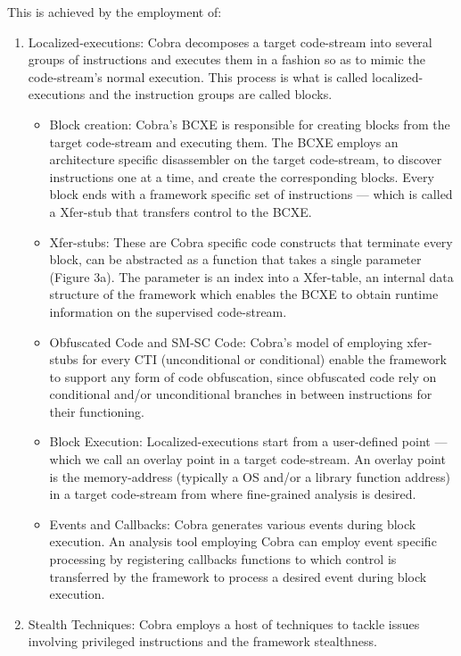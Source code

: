 \documentclass[11pt]{article}
\begin{document}
		This is achieved by the employment of:
		\begin{enumerate}
			\item Localized-executions: Cobra decomposes a target code-stream into several groups of instructions and executes them in a fashion so as to mimic the code-stream’s normal execution. This process is what is called localized-executions and the instruction groups are called blocks.
			\begin{itemize}
				\item Block creation: Cobra’s BCXE is responsible for creating blocks from the target code-stream and executing them. The BCXE employs an architecture specific disassembler on the target code-stream, to discover instructions one at a time, and create the corresponding blocks. Every block ends with a framework specific set of instructions — which is called a Xfer-stub that transfers control to the BCXE.
				\item Xfer-stubs: These are Cobra specific code constructs that terminate every block, can be abstracted as a function that takes a single parameter (Figure 3a). The parameter is an index into a Xfer-table, an internal data structure of the framework which enables the BCXE to obtain runtime information on the supervised code-stream.
				\item Obfuscated Code and SM-SC Code: Cobra’s model of employing xfer-stubs for every CTI (unconditional or conditional) enable the framework to support any form of code obfuscation, since obfuscated code rely on conditional and/or unconditional branches in between instructions for their functioning.
				\item Block Execution: Localized-executions start from a user-defined point — which we call an overlay point in a target code-stream. An overlay point is the memory-address (typically a OS and/or a library function address) in a target code-stream from where fine-grained analysis is desired.
				\item Events and Callbacks: Cobra generates various events during block execution. An analysis tool employing Cobra can employ event specific processing by registering callbacks functions to which control is transferred by the framework to process a desired event during block execution.
			\end{itemize}
			\item Stealth Techniques: Cobra employs a host of techniques to tackle issues involving privileged instructions and the framework stealthness. 
			\begin{itemize}

\end{itemize}
\end{enumerate}
\end{document}
